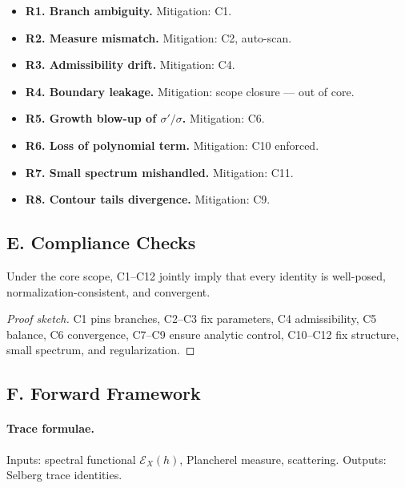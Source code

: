\begin{itemize}
  \item \textbf{R1. Branch ambiguity.} Mitigation: C1. 
  \item \textbf{R2. Measure mismatch.} Mitigation: C2, auto-scan. 
  \item \textbf{R3. Admissibility drift.} Mitigation: C4. 
  \item \textbf{R4. Boundary leakage.} Mitigation: scope closure — out of core.
  \item \textbf{R5. Growth blow-up of $\sigma'/\sigma$.} Mitigation: C6. 
  \item \textbf{R6. Loss of polynomial term.} Mitigation: C10 enforced. 
  \item \textbf{R7. Small spectrum mishandled.} Mitigation: C11. 
  \item \textbf{R8. Contour tails divergence.} Mitigation: C9.
\end{itemize}


\subsection*{E. Compliance Checks}
\label{subsec:compliance-final}

\begin{lemma}
Under the core scope, C1–C12 jointly imply that every identity is well-posed, normalization-consistent, and convergent. 
\end{lemma}

\begin{proof}[Proof sketch]
C1 pins branches, C2–C3 fix parameters, C4 admissibility, C5 balance, C6 convergence, C7–C9 ensure analytic control, C10–C12 fix structure, small spectrum, and regularization. 
\end{proof}


\subsection*{F. Forward Framework}
\label{subsec:forward-final}

\paragraph{Trace formulae.} Inputs: spectral functional $\mathcal E_X(h)$, Plancherel measure, scattering. Outputs: Selberg trace identities. 

